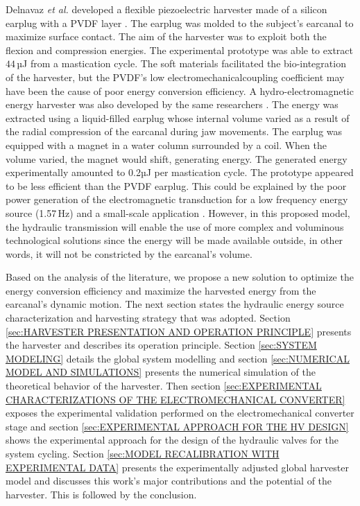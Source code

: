 \documentclass[3p,twocolumn,preprint]{elsarticle}
\begin{document}
Delnavaz \emph{et al.} developed a flexible piezoelectric harvester made of a silicon earplug with a PVDF layer \cite{Delnavaz2013}. The earplug was molded to the subject's earcanal to maximize surface contact. The aim of the harvester was to exploit both the flexion and compression energies. The experimental prototype was able to extract $44$\,µJ from a mastication cycle. The soft materials facilitated the bio-integration of the harvester, but the PVDF's low electromechanicalcoupling coefficient may have been the cause of poor energy conversion efficiency. A hydro-electromagnetic energy harvester was also developed by the same researchers \cite{Delnavaz2012}. The energy was extracted using a liquid-filled earplug whose internal volume varied as a result of the radial compression of the earcanal during jaw movements. The earplug was equipped with a magnet in a water column surrounded by a coil. When the volume varied, the magnet would shift, generating energy. The generated energy experimentally amounted to 0.2µJ per mastication cycle. The prototype appeared to be less efficient than the PVDF earplug. This could be explained by the poor power generation of the electromagnetic transduction for a low frequency energy source (1.57\,Hz) and a small-scale application \cite{Kulah2008,Priya2017}. However, in this proposed model, the hydraulic transmission will enable the use of more complex and voluminous technological solutions since the energy will be made available outside, in other words, it will not be constricted by the earcanal's volume.

Based on the analysis of the literature, we propose a new solution to optimize the energy conversion efficiency and maximize the harvested energy from the earcanal's dynamic motion. The next section states the hydraulic energy source characterization and harvesting strategy that was adopted. Section \ref{sec:HARVESTER PRESENTATION AND OPERATION PRINCIPLE} presents the harvester and describes its operation principle. Section \ref{sec:SYSTEM MODELING} details the global system modelling and section \ref{sec:NUMERICAL MODEL AND SIMULATIONS} presents the numerical simulation of the theoretical behavior of the harvester. Then section \ref{sec:EXPERIMENTAL CHARACTERIZATIONS OF THE ELECTROMECHANICAL CONVERTER} exposes the experimental validation performed on the electromechanical converter stage and section \ref{sec:EXPERIMENTAL APPROACH FOR THE HV DESIGN} shows the experimental approach for the design of the hydraulic valves for the system cycling. Section \ref{sec:MODEL RECALIBRATION WITH EXPERIMENTAL DATA} presents the experimentally adjusted global harvester model and discusses this work's major contributions and the potential of the harvester. This is followed by the conclusion.
\end{document}
